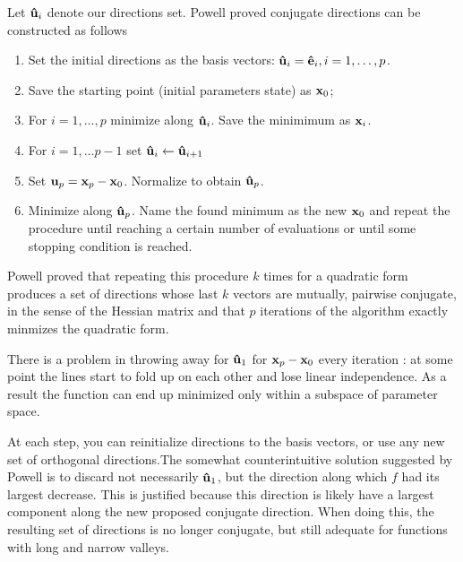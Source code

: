 Let $\vu{u}_i$ denote our directions set. Powell proved conjugate directions can be constructed as follows
\begin{enumerate}
    \item Set the initial directions as the basis vectors: $\vu{u}_i=\vu{e}_i, i=1,\dots, p$.
    \item Save the starting point (initial parameters state) as $\vb{x}_0$;
    \item For $i=1,\dots, p$ minimize along $\vu{u}_i$. Save the minimimum as $\vb{x}_i$.
    \item For $i=1,\dots p-1$ set $\vu{u}_i\leftarrow\vu{u}_{i+1}$
    \item Set $\vb{u}_p=\vb{x}_p - \vb{x}_0$. Normalize to obtain $\vu{u}_p$.
    \item Minimize along $\vu{u}_p$. Name the found minimum as the new $\vb{x}_0$ and repeat the procedure until reaching a certain number of evaluations or until some stopping condition is reached.
\end{enumerate}

Powell proved that repeating this procedure $k$ times for a quadratic form produces a set of directions whose last $k$ vectors are mutually, pairwise conjugate, in the sense of the Hessian matrix and that $p$ iterations of the algorithm exactly minmizes the quadratic form.

There is a problem in throwing away  for $\vu{u}_1$ for $\vb{x}_p - \vb{x}_0$ every iteration  : at some point the lines start to fold up on each other and lose linear independence. As a result the function can end up minimized only within a subspace of parameter space.

At each step, you can reinitialize directions to the basis vectors, or use any new set of orthogonal directions.The somewhat counterintuitive solution suggested by Powell is to discard not necessarily $\vu{u}_1$, but the direction along which $f$ had its largest decrease. This is justified because this direction is likely have a largest component along the new proposed conjugate direction. When doing this, the resulting set of directions is no longer conjugate, but still adequate for functions with long and narrow valleys.

